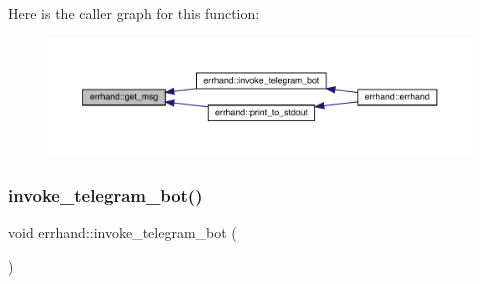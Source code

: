 Here is the caller graph for this function\+:\nopagebreak
\begin{figure}[H]
\begin{center}
\leavevmode
\includegraphics[width=350pt]{classerrhand_a524dfc6821f703329d8801dd3298f33f_icgraph}
\end{center}
\end{figure}
\mbox{\label{classerrhand_adbc86e81b391a68d2bf9a13529c977d3}} 
\subsubsection{\texorpdfstring{invoke\+\_\+telegram\+\_\+bot()}{invoke\_telegram\_bot()}}
{\footnotesize\ttfamily void errhand\+::invoke\+\_\+telegram\+\_\+bot (\begin{DoxyParamCaption}{ }\end{DoxyParamCaption})\hspace{0.3cm}{\ttfamily [inline]}}

